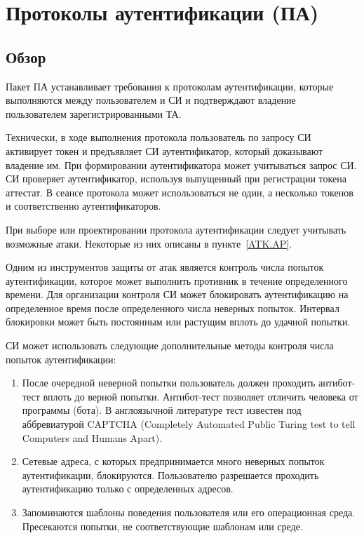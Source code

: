 \section{Протоколы аутентификации (ПА)}\label{AP}

\subsection{Обзор}\label{AP.Intro}

Пакет ПА устанавливает требования к протоколам аутентификации,
которые выполняются между пользователем и СИ и подтверждают владение
пользователем зарегистрированными ТА.

Технически, в ходе выполнения протокола пользователь по запросу 
СИ активирует токен и предъявляет СИ аутентификатор, который доказывают 
владение им. При формировании аутентификатора может учитываться запрос СИ. 
СИ проверяет аутентификатор, используя выпущенный при регистрации токена 
аттестат.
%
В сеансе протокола может использоваться не один, а несколько токенов и 
соответственно аутентификаторов.

При выборе или проектировании протокола аутентификации следует учитывать 
возможные атаки. Некоторые из них описаны в пункте~\ref{ATK.AP}. 

Одним из инструментов защиты от атак является контроль числа попыток 
аутентификации, которое может выполнить противник в течение определенного 
времени. Для организации контроля СИ может блокировать аутентификацию на 
определенное время после определенного числа неверных попыток. Интервал 
блокировки может быть постоянным или растущим вплоть до удачной попытки. 

СИ может использовать следующие дополнительные методы контроля числа
попыток аутентификации:
\begin{enumerate}
\item
После очередной неверной попытки пользователь должен проходить антибот-тест 
вплоть до верной попытки. Антибот-тест позволяет отличить человека от 
программы (бота). В англоязычной литературе тест известен под 
аббревиатурой CAPTCHA (Completely Automated Public Turing test to tell 
Computers and Humans Apart). 

\item
Сетевые адреса, с которых предпринимается много неверных попыток 
аутентификации, блокируются. Пользователю разрешается проходить аутентификацию 
только с определенных адресов.

\item
Запоминаются шаблоны поведения пользователя или его операционная среда. 
Пресекаются попытки, не соответствующие шаблонам или среде.
\end{enumerate}

